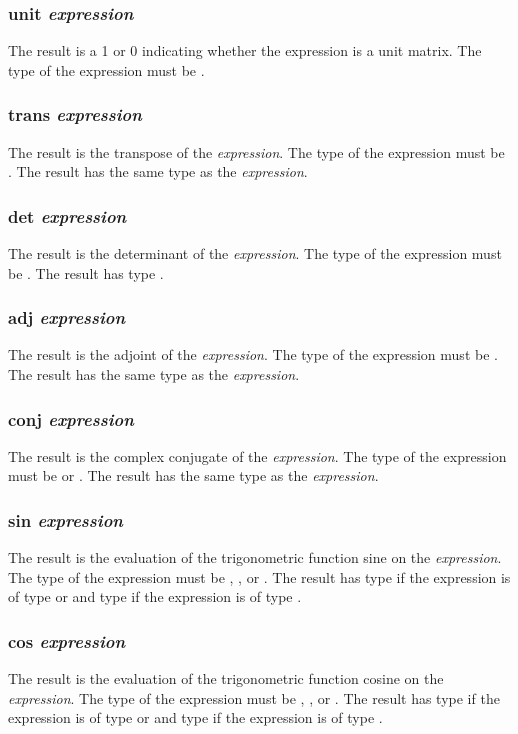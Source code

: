 \subsubsection{unit \textit{expression}}
The result is a 1 or 0 indicating whether the expression is a unit matrix. The type of the expression must be \mat.
\subsubsection{trans \textit{expression}}
The result is the transpose of the \textit{expression}. The type of the expression must be \mat. The result has the same type as the \textit{expression}.
\subsubsection{det \textit{expression}}
The result is the determinant of the \textit{expression}. The type of the expression must be \mat. The result has type \complex.
\subsubsection{adj \textit{expression}}
The result is the adjoint of the \textit{expression}. The type of the expression must be \mat. The result has the same type as the \textit{expression}.
\subsubsection{conj \textit{expression}}
The result is the complex conjugate of the \textit{expression}. The type of the expression must be \complex or \mat. The result has the same type as the \textit{expression}.
\subsubsection{sin \textit{expression}}
The result is the evaluation of the trigonometric function sine on the \textit{expression}. The type of the expression must be \integ, \float, or  \complex. The result has type \float if the expression is of type \integ or \float and type \complex if the expression is of type  \complex.
\subsubsection{cos \textit{expression}}
The result is the evaluation of the trigonometric function cosine on the \textit{expression}. The type of the expression must be \integ, \float, or  \complex. The result has type \float if the expression is of type \integ or \float and type \complex if the expression is of type  \complex.
